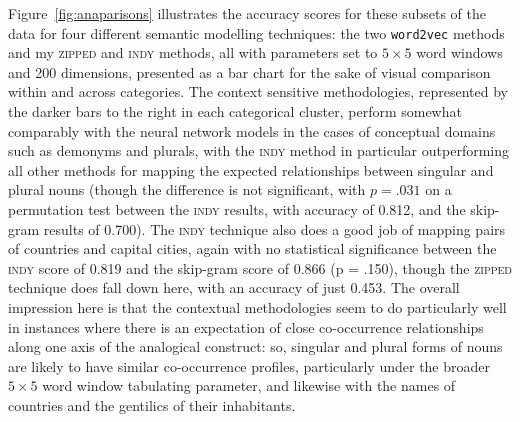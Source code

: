 \noindent Figure~\ref{fig:anaparisons} illustrates the accuracy scores for these subsets of the data for four different semantic modelling techniques: the two \texttt{word2vec} methods and my \textsc{zipped} and \textsc{indy} methods, all with parameters set to $5 \times 5$ word windows and 200 dimensions, presented as a bar chart for the sake of visual comparison within and across categories.  The context sensitive methodologies, represented by the darker bars to the right in each categorical cluster, perform somewhat comparably with the neural network models in the cases of conceptual domains such as demonyms and plurals, with the \textsc{indy} method in particular outperforming all other methods for mapping the expected relationships between singular and plural nouns (though the difference is not significant, with $p = .031$ on a permutation test between the \textsc{indy} results, with accuracy of 0.812, and the skip-gram results of 0.700).  The \textsc{indy} technique also does a good job of mapping pairs of countries and capital cities, again with no statistical significance between the \textsc{indy} score of 0.819 and the skip-gram score of 0.866 (p = .150), though the \textsc{zipped} technique does fall down here, with an accuracy of just 0.453.  The overall impression here is that the contextual methodologies seem to do particularly well in instances where there is an expectation of close co-occurrence relationships along one axis of the analogical construct: so, singular and plural forms of nouns are likely to have similar co-occurrence profiles, particularly under the broader $5 \times 5$ word window tabulating parameter, and likewise with the names of countries and the gentilics of their inhabitants.

